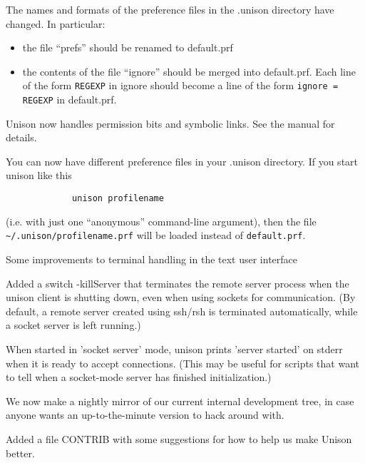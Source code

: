 \begin{changesfromversion}{1.111}
\item \incompatible{} The names and formats of the preference files in
the .unison directory have changed.  In particular:
\begin{itemize}
\item the file ``prefs'' should be renamed to default.prf
\item the contents of the file ``ignore'' should be merged into
  default.prf.  Each line of the form \verb|REGEXP| in ignore should
  become a line of the form \verb|ignore = REGEXP| in default.prf.
\end{itemize}
\item Unison now handles permission bits and  symbolic links.  See the
manual for details.

\item You can now have different preference files in your .unison
directory.  If you start unison like this
\begin{verbatim}
             unison profilename
\end{verbatim}
(i.e. with just one ``anonymous'' command-line argument), then the
file \verb|~/.unison/profilename.prf| will be loaded instead of
\verb|default.prf|.

\item Some improvements to terminal handling in the text user interface

\item Added a switch -killServer that terminates the remote server process
when the unison client is shutting down, even when using sockets for
communication.  (By default, a remote server created using ssh/rsh is
terminated automatically, while a socket server is left running.)
\item When started in 'socket server' mode, unison prints 'server started' on
  stderr when it is ready to accept connections.
  (This may be useful for scripts that want to tell when a socket-mode server
  has finished initialization.)
\item We now make a nightly mirror of our current internal development
  tree, in case anyone wants an up-to-the-minute version to hack
  around with.
\item Added a file CONTRIB with some suggestions for how to help us
make Unison better.
\end{changesfromversion}
